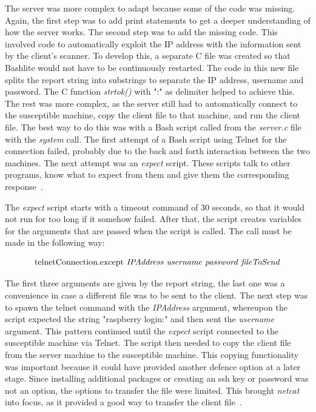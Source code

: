The server was more complex to adapt because some of the code was missing. Again, the first step was to add print statements to get a deeper understanding of how the server works. The second step was to add the missing code. This involved code to automatically exploit the IP address with the information sent by the client's scanner. To develop this, a separate C file was created so that Bashlite would not have to be continuously restarted. The code in this new file splits the report string into substrings to separate the IP address, username and password. The C function \textit{strtok()} with ":" as delimiter helped to achieve this. The rest was more complex, as the server still had to automatically connect to the susceptible machine, copy the client file to that machine, and run the client file. The best way to do this was with a Bash script called from the \textit{server.c} file with the \textit{system} call. The first attempt of a Bash script using Telnet for the connection failed, probably due to the back and forth interaction between the two machines. The next attempt was an \textit{expect} script. These scripts talk to other programs, know what to expect from them and give them the corresponding response~\cite{website:linuxExpect}. 

The \textit{expect} script starts with a timeout command of 30 seconds, so that it would not run for too long if it somehow failed. After that, the script creates variables for the arguments that are passed when the script is called. The call must be made in the following way:

\[ \mbox{telnetConnection.except \textit{IPAddress} \textit{username} \textit{password} \textit{fileToSend}}  \]

The first three arguments are given by the report string, the last one was a convenience in case a different file was to be sent to the client. The next step was to spawn the telnet command with the \textit{IPAddress} argument, whereupon the script expected the string "raspberry login:" and then sent the \textit{username} argument. This pattern continued until the \textit{expect} script connected to the susceptible machine via Telnet. The script then needed to copy the client file from the server machine to the susceptible machine. This copying functionality was important because it could have provided another defence option at a later stage. Since installing additional packages or creating an ssh key or password was not an option, the options to transfer the file were limited. This brought \textit{netcat} into focus, as it provided a good way to transfer the client file~\cite{website:netcat}.


